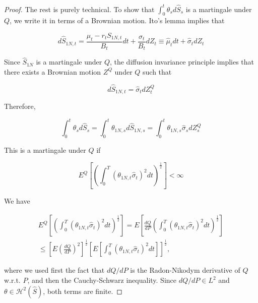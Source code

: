 \documentclass[\topdir/lecture\_notes.tex]{subfiles}
\begin{document}
\begin{proof}
The rest is purely technical. To show that \(\int_{0}^{t} \theta_{s} d \hat{S}_{s}\) is a martingale under \(Q\), we write it in terms of a Brownian motion. Ito's lemma implies that

\begin{equation*}
d \hat{S}_{1 N, t}=\frac{\mu_{t}-r_{t} S_{1 N, t}}{B_{t}} d t+\frac{\sigma_{t}}{B_{t}} d Z_{t} \equiv \hat{\mu}_{t} d t+\hat{\sigma}_{t} d Z_{t}
\end{equation*}

Since \(\hat{S}_{1 N}\) is a martingale under \(Q\), the diffusion invariance principle implies that there exists a Brownian motion \(Z^{Q}\) under \(Q\) such that

\begin{equation*}
d \hat{S}_{1 N, t}=\hat{\sigma}_{t} d Z_{t}^{Q}
\end{equation*}

Therefore,

\begin{equation*}
\int_{0}^{t} \theta_{s} d \hat{S}_{s}=\int_{0}^{t} \theta_{1 N, s} d \hat{S}_{1 N, s}=\int_{0}^{t} \theta_{1 N, s} \hat{\sigma}_{s} d Z_{s}^{Q}
\end{equation*}

This is a martingale under \(Q\) if

\begin{equation*}
E^{Q}\left[\left(\int_{0}^{T}\left(\theta_{1 N, t} \hat{\sigma}_{t}\right)^{2} d t\right)^{\frac{1}{2}}\right]<\infty
\end{equation*}

We have

\begin{equation*}
\begin{gathered}
E^{Q}\left[\left(\int_{0}^{T}\left(\theta_{1 N, t} \hat{\sigma}_{t}\right)^{2} d t\right)^{\frac{1}{2}}\right]=E\left[\frac{d Q}{d P}\left(\int_{0}^{T}\left(\theta_{1 N, t} \hat{\sigma}_{t}\right)^{2} d t\right)^{\frac{1}{2}}\right] \\
\leq\left[E\left(\frac{d Q}{d P}\right)^{2}\right]^{\frac{1}{2}}\left[E\left[\int_{0}^{T}\left(\theta_{1 N, t} \hat{\sigma}_{t}\right)^{2} d t\right]\right]^{\frac{1}{2}},
\end{gathered}
\end{equation*}

where we used first the fact that \(d Q / d P\) is the Radon-Nikodym derivative of \(Q\) w.r.t. \(P\), and then the Cauchy-Schwarz inequality. Since \(d Q / d P \in L^{2}\) and \(\theta \in \mathcal{H}^{2}(\hat{S})\), both terms are finite.


\end{proof}
\end{document}
